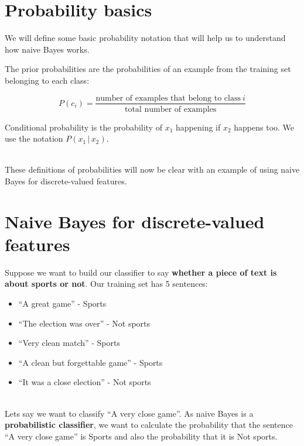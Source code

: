 \documentclass[11pt,fleqn]{book} %
\begin{document}
\section{Probability basics}
\noindent
We will define some basic probability notation that will help us to understand how naive Bayes works. \\

\begin{definition}
	The prior probabilities are the probabilities of an example from the training set belonging to each class:
	
	\begin{equation}
	P(c_i) = \frac{\textrm{number of examples that belong to class}~i}{\textrm{total number of examples}}
	\end{equation}
\end{definition}

\begin{definition}
	Conditional probability is the probability of $x_1$ happening if $x_2$ happens too. We use the notation $P(x_1 \, \vert \, x_2)$.
\end{definition}
\ \\ 
\noindent
These definitions of probabilities will now be clear with an example of using naive Bayes for discrete-valued features.

\section{Naive Bayes for discrete-valued features}
\noindent
Suppose we want to build our classifier to say \textbf{whether a piece of text is about sports or not}. Our training set has 5 sentences: \\
\begin{itemize}
	\item “A great game” - Sports
	\item “The election was over” - Not sports
	\item “Very clean match” - Sports
	\item “A clean but forgettable game” - Sports
	\item “It was a close election” - Not sports
\end{itemize}
\ \\
\noindent
Lets say we want to classify “A very close game”.
As naive Bayes is a \textbf{probabilistic classifier}, we want to calculate the probability that the sentence “A very close game” is Sports and also the probability that it is Not sports. \\
\end{document}
